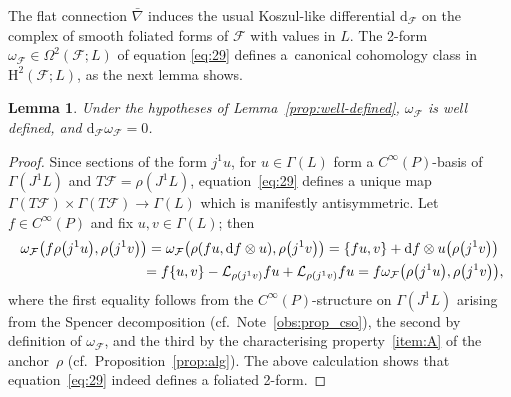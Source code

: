 \documentclass[10pt,a4paper]{amsart}
\numberwithin{equation}{section}
\newtheorem{Lemma}[Theorem]{Lemma}
\newcommand{\de}{\mathrm{d}} %
\newcommand{\HH}{\mathrm{H}}
\begin{document}
The f\/lat connection $\bar\nabla$ induces the usual Koszul-like dif\/ferential $\de_{\mathcal{F}}$ on the complex of smooth foliated forms of $\mathcal{F}$ with values in $L$. The 2-form $\omega_{\mathcal{F}}\in\Omega^2(\mathcal{F};L)$ of equation \eqref{eq:29} def\/ines a~canonical cohomology class in $\HH^2(\mathcal{F};L)$, as the next lemma shows.

\begin{Lemma}\label{lemma:coho_class} Under the hypotheses of Lemma~{\rm \ref{prop:well-defined}}, $\omega_{\mathcal{F}}$ is well defined, and $\de_{\mathcal{F}} \omega_{\mathcal{F}} = 0$.
\end{Lemma}

\begin{proof} Since sections of the form $j^1 u$, for $u \in \Gamma(L)$ form a $C^{\infty}(P)$-basis of $\Gamma(J^1 L)$ and $T \mathcal{F} = \rho(J^1 L)$, equation~\eqref{eq:29} def\/ines a unique map $\Gamma(T \mathcal{F}) \times \Gamma(T \mathcal{F}) \to \Gamma(L)$ which is manifestly antisymmetric. Let $f \in C^{\infty}(P)$ and f\/ix $u,v \in \Gamma(L)$; then
 \begin{gather*}
 \omega_{\mathcal{F}}\big(f\rho\big(j^1 u\big), \rho\big(j^1 v\big)\big) = \omega_{\mathcal{F}}\big(\rho(fu,\de f \otimes u), \rho\big(j^1v\big)\big) = \{fu,v\} + \de f \otimes u\big(\rho\big(j^1v\big)\big) \\
\hphantom{\omega_{\mathcal{F}}\big(f\rho\big(j^1 u\big), \rho\big(j^1 v\big)\big)}{}
=f\{u,v\} - \mathcal{L}_{\rho(j^1v)}f u + \mathcal{L}_{\rho(j^1v)}f u = f \omega_{\mathcal{F}}\big(\rho\big(j^1 u\big), \rho\big(j^1 v\big)\big),
\end{gather*}
where the f\/irst equality follows from the $C^{\infty}(P)$-structure on $\Gamma(J^1 L)$ arising from the Spencer decomposition (cf.\ Note~\ref{obs:prop_cso}), the second by def\/inition of $\omega_{\mathcal{F}}$, and the third by the characterising property~\ref{item:A} of the anchor~$\rho$ (cf.\ Proposition~\ref{prop:alg}). The above calculation shows that equation~\eqref{eq:29} indeed def\/ines a foliated 2-form.


\end{proof}
\end{document}
